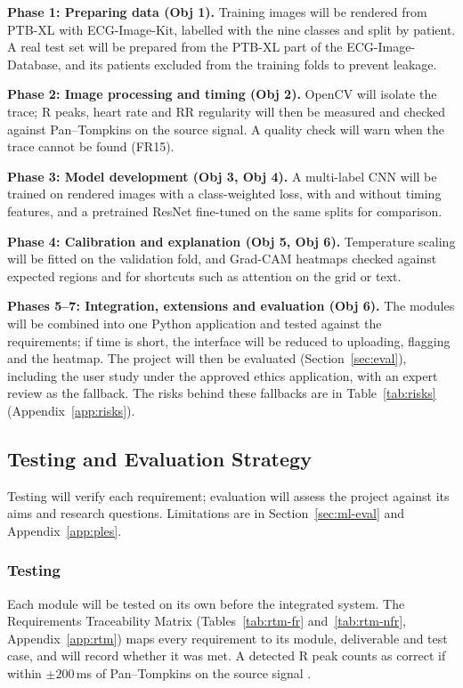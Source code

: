 \documentclass[12pt,nonacm,acmlarge,titlepage,screen]{acmart}
\begin{document}
\textbf{Phase 1: Preparing data (Obj 1).} Training images will be rendered from PTB-XL with ECG-Image-Kit, labelled with the nine classes and split by patient. A real test set will be prepared from the PTB-XL part of the ECG-Image-Database, and its patients excluded from the training folds to prevent leakage.

\textbf{Phase 2: Image processing and timing (Obj 2).} OpenCV will isolate the trace; R peaks, heart rate and RR regularity will then be measured and checked against Pan--Tompkins on the source signal. A quality check will warn when the trace cannot be found (FR15).

\textbf{Phase 3: Model development (Obj 3, Obj 4).} A multi-label CNN will be trained on rendered images with a class-weighted loss, with and without timing features, and a pretrained ResNet fine-tuned on the same splits for comparison.

\textbf{Phase 4: Calibration and explanation (Obj 5, Obj 6).} Temperature scaling will be fitted on the validation fold, and Grad-CAM heatmaps checked against expected regions and for shortcuts such as attention on the grid or text.

\textbf{Phases 5--7: Integration, extensions and evaluation (Obj 6).} The modules will be combined into one Python application and tested against the requirements; if time is short, the interface will be reduced to uploading, flagging and the heatmap. The project will then be evaluated (Section~\ref{sec:eval}), including the user study under the approved ethics application, with an expert review as the fallback. The risks behind these fallbacks are in Table~\ref{tab:risks} (Appendix~\ref{app:risks}).



\subsection{Testing and Evaluation Strategy}
\label{sec:evaluation}

Testing will verify each requirement; evaluation will assess the project against its aims and research questions. Limitations are in Section~\ref{sec:ml-eval} and Appendix~\ref{app:ples}.

\subsubsection{Testing}
\label{sec:testing}

Each module will be tested on its own before the integrated system. The Requirements Traceability Matrix (Tables~\ref{tab:rtm-fr} and~\ref{tab:rtm-nfr}, Appendix~\ref{app:rtm}) maps every requirement to its module, deliverable and test case, and will record whether it was met. A detected R peak counts as correct if within $\pm200$\,ms of Pan--Tompkins on the source signal \cite{pan_real-time_1985}.
\end{document}
